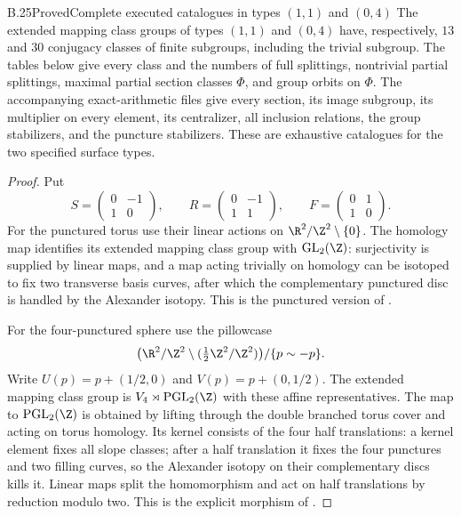 \begin{claim}{B.25}{Proved}{Complete executed catalogues in types $(1,1)$ and $(0,4)$}
The extended mapping class groups of types $(1,1)$ and $(0,4)$ have,
respectively, $13$ and $30$ conjugacy classes of finite subgroups, including
the trivial subgroup.  The tables below give every class and the numbers of
full splittings, nontrivial partial splittings, maximal partial section
classes $\Phi$, and group orbits on $\Phi$.  The accompanying exact-arithmetic
files give every section, its image subgroup, its multiplier on every
element, its centralizer, all inclusion relations, the group stabilizers,
and the puncture stabilizers.  These are exhaustive catalogues for the two
specified surface types.
\end{claim}
\begin{proof}
Put
\[
 S=\begin{pmatrix}0&-1\\1&0\end{pmatrix},\qquad
 R=\begin{pmatrix}0&-1\\1&1\end{pmatrix},\qquad
 F=\begin{pmatrix}0&1\\1&0\end{pmatrix}.
\]
For the punctured torus use their linear actions on
$\R^2/\Z^2\setminus\{0\}$.  The homology map identifies its extended
mapping class group with $\mathrm{GL}_2(\Z)$: surjectivity is supplied by
linear maps, and a map acting trivially on homology can be isotoped to fix
two transverse basis curves, after which the complementary punctured disc
is handled by the Alexander isotopy.  This is the punctured version of
\cite[Theorem 2.5 and pp.~54--55]{bFarbMargalit2012}.

For the four-punctured sphere use the pillowcase
\[
 \bigl(\R^2/\Z^2\setminus (\tfrac12\Z^2/\Z^2)\bigr)/\{p\sim-p\}.
\]
Write $U(p)=p+(1/2,0)$ and $V(p)=p+(0,1/2)$.  The extended mapping
class group is
$V_4\rtimes\mathrm{PGL}_2(\Z)$ with these affine representatives.
The map to $\mathrm{PGL}_2(\Z)$ is obtained by lifting through the double
branched torus cover and acting on torus homology.  Its kernel consists of
the four half translations: a kernel element fixes all slope classes;
after a half translation it fixes the four punctures and two filling
curves, so the Alexander isotopy on their complementary discs kills it.
Linear maps split the homomorphism and act on half translations by
reduction modulo two.  This is the explicit morphism of
\cite[Proposition 2.7 and the extended statement on p.~57]{bFarbMargalit2012}.


\end{proof}
